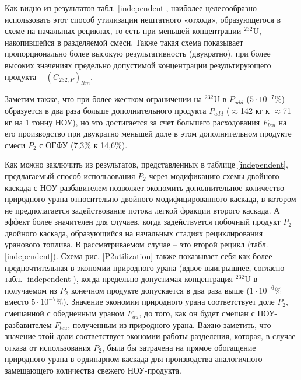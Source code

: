 Как видно из результатов табл. \ref{independent}, наиболее целесообразно использовать этот способ утилизации нештатного «отхода», образующегося в схеме на начальных рециклах, то есть при меньшей концентрации $^{232}$U, накопившейся в разделяемой смеси. Также  такая схема показывает пропорционально более высокую результативность (двукратно), при более высоких значениях предельно допустимой концентрации результирующего продукта -- $(C_{232,P})_{lim}$.

Заметим также, что при более жестком ограничении на $^{232}$U в $P_{add}$ ($5\cdot10^{-7}$\%) образуется в два раза больше дополнительного продукта $P_{add}$ ($\approx$142 кг к $\approx$71 кг на 1 тонну НОУ), но это достигается за счет большего расходования $F_{leu}$ на его производство при двукратно меньшей доле в этом дополнительном продукте смеси $P_2$ с ОГФУ (7,3\% к 14,6\%). 

Как можно заключить из результатов, представленных в таблице \ref{independent}, предлагаемый способ использования $P_2$ через модификацию схемы двойного каскада с НОУ-разбавителем позволяет экономить дополнительное количество природного урана относительно двойного модифицированного каскада, в котором не предполагается задействование потока легкой фракции второго каскада. А эффект более значителен для случаев, когда задействуется побочный продукт $P_2$ двойного каскада, образующийся на начальных стадиях рециклирования уранового топлива. В рассматриваемом случае -- это второй рецикл (табл. \ref{independent}). Схема рис. \ref{P2utilization} также показывает себя как более предпочтительная в экономии природного урана (вдвое выигрышнее, согласно табл. \ref{independent}), когда предельно допустимая концентрация $^{232}$U в получаемом из $P_2$ конечном продукте допускается в два раза выше ($1\cdot10^{-6}$\% вместо $5\cdot10^{-7}$\%).  Значение экономии природного урана соответствует доле $P_2$, смешанной с обедненным ураном $F_{du}$, до того, как он будет смешан с НОУ-разбавителем $F_{leu}$, полученным из природного урана. Важно заметить, что значение этой доли соответствует экономии работы разделения, которая, в случае отказа от использования $P_2$, была бы затрачена на прямое обогащение природного урана в ординарном каскада для производства аналогичного замещающего количества свежего НОУ-продукта.

